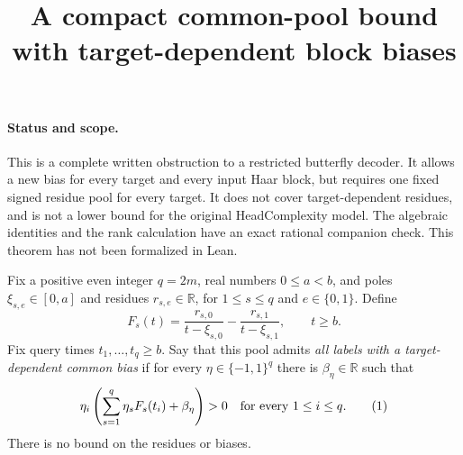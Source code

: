 \documentclass[11pt]{article}
\begin{document}
\title{A compact common-pool bound with target-dependent block biases}
\author{}
\date{}
\maketitle

\paragraph{Status and scope.}
This is a complete written obstruction to a restricted butterfly decoder.
It allows a new bias for every target and every input Haar block, but
requires one fixed signed residue pool for every target. It does not
cover target-dependent residues, and is not a lower bound for the
original HeadComplexity model. The algebraic identities and the rank
calculation have an exact rational companion check. This theorem has not
been formalized in Lean.

Fix a positive even integer $q=2m$, real numbers $0\leq a<b$, and poles
$\xi_{s,e}\in[0,a]$ and residues $r_{s,e}\in\mathbb R$, for
$1\leq s\leq q$ and $e\in\{0,1\}$. Define
\[
 F_s(t)=\frac{r_{s,0}}{t-\xi_{s,0}}
       -\frac{r_{s,1}}{t-\xi_{s,1}},\qquad t\geq b.
\]
Fix query times $t_1,\ldots,t_q\geq b$. Say that this pool admits
\emph{all labels with a target-dependent common bias} if for every
$\eta\in\{-1,1\}^q$ there is $\beta_\eta\in\mathbb R$ such that
\[
 \eta_i\left(\sum_{s=1}^q\eta_s F_s(t_i)+\beta_\eta\right)>0
 \quad\hbox{for every }1\leq i\leq q.                 \tag{1}
\]
There is no bound on the residues or biases.
\end{document}
